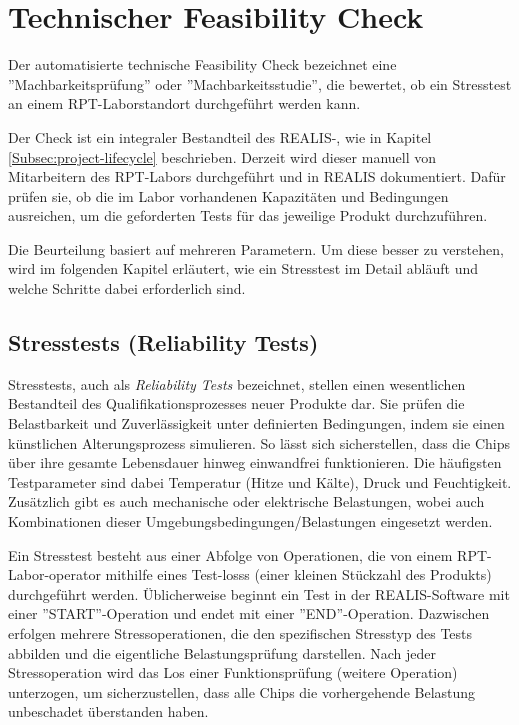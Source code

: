 \section{Technischer Feasibility Check}
Der automatisierte technische Feasibility Check bezeichnet eine ''Machbarkeitsprüfung'' oder ''Machbarkeitsstudie'', die bewertet, ob ein Stresstest an einem \gls{RPT}-Laborstandort durchgeführt werden kann.

Der Check ist ein integraler Bestandteil des \gls{REALIS}-, wie in Kapitel \ref{Subsec:project-lifecycle} beschrieben. Derzeit wird dieser manuell von Mitarbeitern des \gls{RPT}-Labors durchgeführt und in \gls{REALIS} dokumentiert. Dafür prüfen sie, ob die im Labor vorhandenen Kapazitäten und Bedingungen ausreichen, um die geforderten Tests für das jeweilige Produkt durchzuführen.

Die Beurteilung basiert auf mehreren Parametern. Um diese besser zu verstehen, wird im folgenden Kapitel erläutert, wie ein Stresstest im Detail abläuft und welche Schritte dabei erforderlich sind.


\subsection{Stresstests (Reliability Tests)}

Stresstests, auch als \textit{Reliability Tests} bezeichnet, stellen einen wesentlichen Bestandteil des Qualifikationsprozesses neuer Produkte dar. Sie prüfen die Belastbarkeit und Zuverlässigkeit unter definierten Bedingungen, indem sie einen künstlichen Alterungsprozess simulieren. So lässt sich sicherstellen, dass die Chips über ihre gesamte Lebensdauer hinweg einwandfrei funktionieren. Die häufigsten Testparameter sind dabei Temperatur (Hitze und Kälte), Druck und Feuchtigkeit. Zusätzlich gibt es auch mechanische oder elektrische Belastungen, wobei auch Kombinationen dieser Umgebungsbedingungen/Belastungen eingesetzt werden.

Ein Stresstest besteht aus einer Abfolge von Operationen, die von einem \gls{RPT}-Labor-\gls{operator} mithilfe eines Test-\glspl{los}s (einer kleinen Stückzahl des Produkts) durchgeführt werden. Üblicherweise beginnt ein Test in der \gls{REALIS}-Software mit einer ''START''-Operation und endet mit einer ''END''-Operation. Dazwischen erfolgen mehrere Stressoperationen, die den spezifischen Stresstyp des Tests abbilden und die eigentliche Belastungsprüfung darstellen. Nach jeder Stressoperation wird das Los einer Funktionsprüfung (weitere Operation) unterzogen, um sicherzustellen, dass alle Chips die vorhergehende Belastung unbeschadet überstanden haben.

